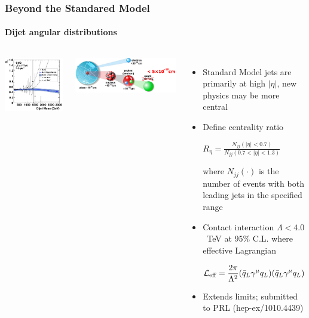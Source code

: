\documentclass[compress]{beamer}
\newcommand{\s}[1]{{\mbox{\scriptsize #1}}}
\begin{document}
\begin{frame}
\frametitle{Beyond the Standared Model}
\framesubtitle{Dijet angular distributions}
\begin{columns}
\includegraphics[width=\linewidth]{dijet_centrality_ratio.png}

\vspace{0.5 cm}
\includegraphics[width=\linewidth]{atom_zoom_b.pdf}

\vspace{-0.3 cm}
\begin{itemize}
\item Standard Model jets are primarily at high $|\eta|$, new physics
  may be more central

\item Define centrality ratio

\mbox{$\displaystyle R_\eta = \frac{N_{jj}(|\eta| < 0.7)}{N_{jj}(0.7 < |\eta| < 1.3)}$}

where $N_{jj}(\cdot)$ is the number of events with both leading jets
in the specified range

\item Contact interaction $\Lambda < 4.0$~TeV at 95\% C.L. where effective Lagrangian

$\displaystyle \mathcal{L}_\s{eff} = \frac{2\pi}{\Lambda^2}
(\bar{q}_L \gamma^\mu q_L)(\bar{q}_L \gamma^\mu q_L)$

\item Extends limits; submitted to PRL (hep-ex/1010.4439)
\end{itemize}
\end{columns}
\end{frame}
\end{document}
